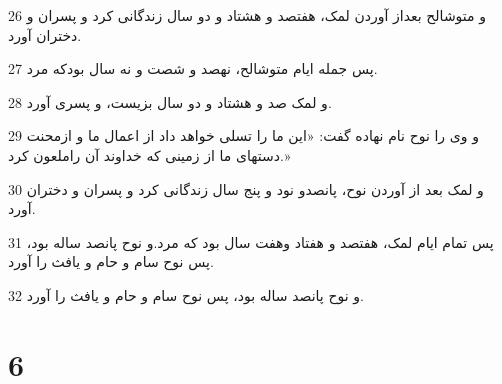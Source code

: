 \par 26 و متوشالح بعداز آوردن لمک، هفتصد و هشتاد و دو سال زندگانی کرد و پسران و دختران آورد.
\par 27 پس جمله ایام متوشالح، نهصد و شصت و نه سال بودکه مرد.
\par 28 و لمک صد و هشتاد و دو سال بزیست، و پسری آورد.
\par 29 و وی را نوح نام نهاده گفت: «این ما را تسلی خواهد داد از اعمال ما و ازمحنت دستهای ما از زمینی که خداوند آن راملعون کرد.»
\par 30 و لمک بعد از آوردن نوح، پانصدو نود و پنج سال زندگانی کرد و پسران و دختران آورد.
\par 31 پس تمام ایام لمک، هفتصد و هفتاد وهفت سال بود که مرد.و نوح پانصد ساله بود، پس نوح سام و حام و یافث را آورد.
\par 32 و نوح پانصد ساله بود، پس نوح سام و حام و یافث را آورد.
 
\chapter{6}

